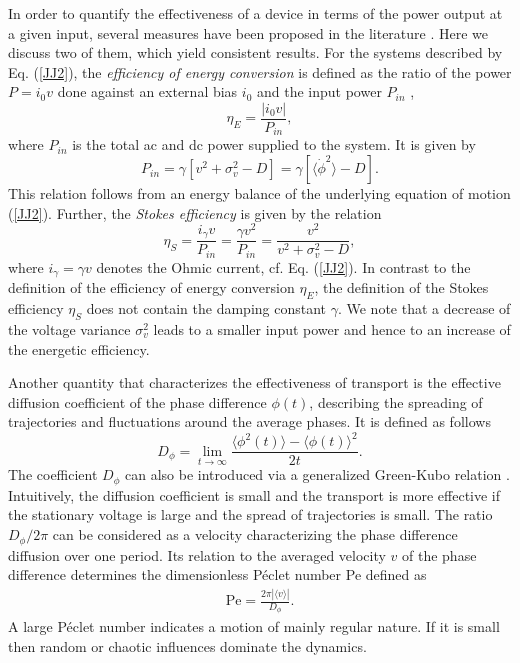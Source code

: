 \documentclass[a4,twocolumn,showpacs,showkeys]{revtex4}
\def\be{\begin{equation}}
\def\ba{\begin{eqnarray}}
\def\ee#1{\label{#1}\end{equation}}
\def\ea#1{\label{#1}\end{eqnarray}}
\def\la{\langle}
\def\ra{\rangle}
\begin{document}
In order to quantify the effectiveness of a device in terms of the
power output at a given input, several measures have been proposed in
the literature \cite{bier,Sekimoto2000,Suzuki2003,wang,machuraPRE,rozen}.
Here we discuss %
two of them, which yield consistent results. 
 For the systems described by Eq. (\ref{JJ2}), the  {\it efficiency of
 energy conversion} is defined as the  ratio of the power $P=i_0 v$
 done against an external  bias $i_0$ and 
the input power $P_{in}$  \cite{sintes,physA},
%
\be \eta_{E} = \frac{|i_0 v|}{P_{in}},   \ee{EtaEnergy}
%
%
where $P_{in}$ is the total ac and dc power supplied to the system.
It is given by \cite{machuraPRE}
%
\be
 P_{in}   = \gamma [v^2  + \sigma_v^2 - D]  = \gamma [\la \dot\phi^2 \ra - D]. 
\ee{eta}
%
This relation follows from an energy balance of the underlying
 equation of motion  (\ref{JJ2}). 
Further, the  {\it Stokes efficiency}  is given by the relation \cite{wang} 
%
\be 
\eta_{S} =  \frac{i_{\gamma} v}{P_{in}}=\frac{\gamma v^2}{P_{in}} 
= \frac{ v^2}{v^2  + \sigma_v^2 - D},   
\ee{EtaStokes}
%
where  $i_{\gamma} = \gamma v$ denotes the Ohmic current, cf. Eq. (\ref{JJ2}). 
In contrast to the definition of the efficiency of energy conversion $\eta_E$, the definition 
of the Stokes efficiency $\eta_S$  does not  contain  the damping  constant $\gamma$. 
We note that a decrease of the voltage variance $\sigma_v^{2}$ leads
to a smaller input power and hence to an increase of the energetic
efficiency. 

Another quantity that characterizes the effectiveness of transport is
the effective diffusion coefficient of the phase difference $\phi(t)$,
describing the spreading of 
trajectories and fluctuations around the average phases. 
It is defined as follows
%
\be D_{\phi} = \lim_{t \rightarrow \infty} \frac{\la \phi^2(t) \ra - \la
\phi(t) \ra^2}{2t}.  \ee{Deff}
The coefficient $D_{\phi}$ can also be introduced via a generalized
Green-Kubo relation \cite{machuraJPC}.  Intuitively, the
diffusion coefficient is small and the transport is more effective if
the stationary 
voltage is large and the spread of trajectories is small.
The ratio $D_{\phi}/2\pi$ can be considered as a velocity characterizing the
phase difference diffusion over one period. Its relation to the
averaged velocity $v$ of the phase difference  determines the
dimensionless P\'eclet number Pe defined as
%
\ba \mbox{Pe} = \frac{ 2\pi|\la v \ra| }{D_{\phi}}. 
 \ea{factors}
%
A large P\'eclet number indicates a motion of mainly regular
nature.  If it is small then random or chaotic influences dominate the dynamics.      
\end{document}

